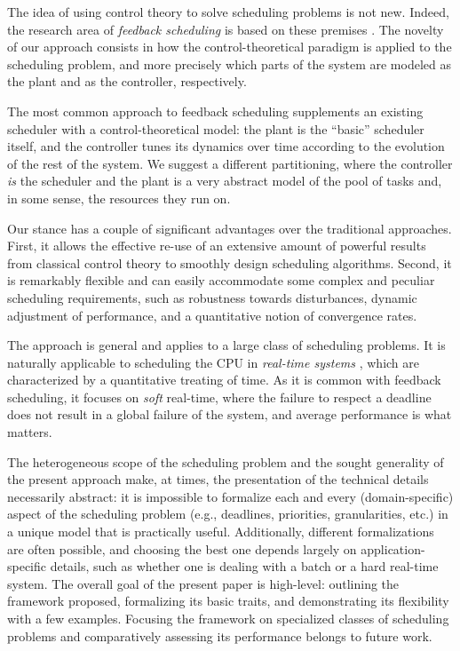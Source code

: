 \documentclass[a4paper]{article}
\begin{document}
The idea of using control theory to solve scheduling problems is not new.
Indeed, the research area of \emph{feedback scheduling} is based on these
premises \cite{LuEtAl-2002a,HellersteinEtAl-2005a}.
The novelty of our approach consists in how the control-theoretical paradigm
is applied to the scheduling problem, and more precisely which parts of the
system are modeled as the plant and as the controller, respectively.

The most common approach to feedback scheduling supplements an existing
scheduler with a control-theoretical model: the plant is the ``basic''
scheduler itself, and the controller tunes its dynamics over time according
to the evolution of the rest of the system. We suggest a different partitioning,
where the controller \emph{is} the scheduler and the plant is a very abstract
model of the pool of tasks and, in some sense, the resources they run on.

Our stance has a couple of significant advantages over the traditional
approaches. First, it allows the effective re-use of an extensive amount of 
powerful results from classical control theory to smoothly design scheduling 
algorithms. Second, it is remarkably flexible and can easily accommodate some 
complex and peculiar scheduling requirements, such as robustness towards 
disturbances, dynamic adjustment of performance, and a quantitative notion of 
convergence rates.

The approach is general and applies to a large class of scheduling problems.
It is naturally applicable to scheduling the CPU in \emph{real-time 
systems} \cite{ButtazzoEtAl-2004a,LiuLayland-1973a}, which are characterized 
by a quantitative treating of time.  As it is common with feedback scheduling,
it focuses on \emph{soft} real-time, where the failure to respect a deadline
does not result in a global failure of the system, and average performance is
what matters.

The heterogeneous scope of the scheduling problem and the sought generality of the present approach make, at times, the presentation of the technical details necessarily abstract: it is impossible to formalize each and every (domain-specific) aspect of the scheduling problem (e.g., deadlines, priorities, granularities, etc.) in a unique model that is practically useful.
Additionally, different formalizations are often possible, and choosing the best one depends largely on application-specific details, such as whether one is dealing with a batch or a hard real-time system.
The overall goal of the present paper is high-level: outlining the framework proposed, formalizing its basic traits, and demonstrating its flexibility with a few examples.
Focusing the framework on specialized classes of scheduling problems and comparatively assessing its performance belongs to future work.
\end{document}

